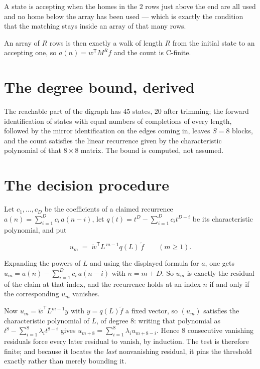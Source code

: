 \documentclass[11pt]{article}
\theoremstyle{definition}
\begin{document}
A state is accepting when the homes in the $2$ rows just above the end are all used and no home below the array has been used --- which is exactly the condition that the matching stays inside an array of that many rows.

An array of $R$ rows is then exactly a walk of length $R$ from the initial state to an accepting one, so $a(n) = w^{\mathsf T}M^{R}f$ and the count is C-finite.

\section{The degree bound, derived}

The reachable part of the digraph has $45$ states, $20$ after trimming; the forward identification of states with equal numbers of completions of every length, followed by the mirror identification on the edges coming in, leaves $S = 8$ blocks, and the count satisfies the linear recurrence given by the characteristic polynomial of that $8\times8$ matrix. The bound is computed, not assumed.

\section{The decision procedure}

Let $c_1,\dots,c_D$ be the coefficients of a claimed recurrence $a(n) = \sum_{i=1}^{D} c_i\,a(n-i)$, let $q(t) = t^{D} - \sum_{i=1}^{D} c_i t^{D-i}$ be its characteristic polynomial, and put

\[u_m \;=\; \tilde w^{\mathsf T} L^{\,m-1} q(L)\,\tilde f \qquad (m \ge 1).\]

Expanding the powers of $L$ and using the displayed formula for $a$, one gets $u_m = a(n) - \sum_{i=1}^{D} c_i\,a(n-i)$ with $n = m + D$. So $u_m$ is exactly the residual of the claim at that index, and the recurrence holds at an index $n$ if and only if the corresponding $u_m$ vanishes.

Now $u_m = \tilde w^{\mathsf T} L^{m-1} y$ with $y = q(L)\tilde f$ a fixed vector, so $(u_m)$ satisfies the characteristic polynomial of $L$, of degree $8$: writing that polynomial as $t^{8} - \sum_{i=1}^{8} \lambda_i t^{8-i}$ gives $u_{m+8} = \sum_{i=1}^{8} \lambda_i u_{m+8-i}$. Hence $8$ consecutive vanishing residuals force every later residual to vanish, by induction. The test is therefore finite; and because it locates the {\itshape last} nonvanishing residual, it pins the threshold exactly rather than merely bounding it.
\end{document}
